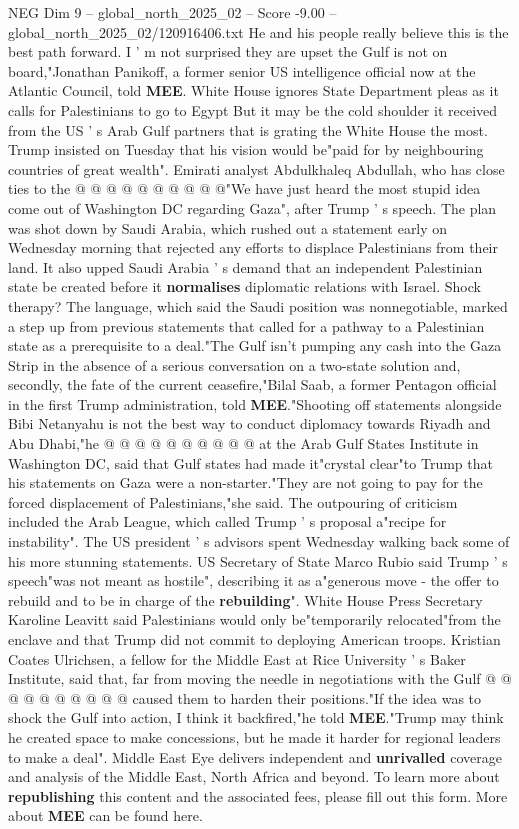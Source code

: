 \begin{textsample}{NEG Dim 9 – global\_north\_2025\_02 – Score -9.00 – global\_north\_2025\_02/120916406.txt}
He and his people really believe this is the best path forward.
I ' m not surprised they are upset the Gulf is not on board,"Jonathan Panikoff, a former senior US intelligence official now at the Atlantic Council, told \textbf{MEE}.
White House ignores State Department pleas as it calls for Palestinians to go to Egypt But it may be the cold shoulder it received from the US ' s Arab Gulf partners that is grating the White House the most.
Trump insisted on Tuesday that his vision would be"paid for by neighbouring countries of great wealth".
Emirati analyst Abdulkhaleq Abdullah, who has close ties to the @ @ @ @ @ @ @ @ @ @"We have just heard the most stupid idea come out of Washington DC regarding Gaza", after Trump ' s speech.
The plan was shot down by Saudi Arabia, which rushed out a statement early on Wednesday morning that rejected any efforts to displace Palestinians from their land.
It also upped Saudi Arabia ' s demand that an independent Palestinian state be created before it \textbf{normalises} diplomatic relations with Israel.
Shock therapy?
The language, which said the Saudi position was nonnegotiable, marked a step up from previous statements that called for a pathway to a Palestinian state as a prerequisite to a deal."The Gulf isn't pumping any cash into the Gaza Strip in the absence of a serious conversation on a two-state solution and, secondly, the fate of the current ceasefire,"Bilal Saab, a former Pentagon official in the first Trump administration, told \textbf{MEE}."Shooting off statements alongside Bibi Netanyahu is not the best way to conduct diplomacy towards Riyadh and Abu Dhabi,"he @ @ @ @ @ @ @ @ @ @ at the Arab Gulf States Institute in Washington DC, said that Gulf states had made it"crystal clear"to Trump that his statements on Gaza were a non-starter."They are not going to pay for the forced displacement of Palestinians,"she said.
The outpouring of criticism included the Arab League, which called Trump ' s proposal a"recipe for instability".
The US president ' s advisors spent Wednesday walking back some of his more stunning statements.
US Secretary of State Marco Rubio said Trump ' s speech"was not meant as hostile", describing it as a"generous move - the offer to rebuild and to be in charge of the \textbf{rebuilding}".
White House Press Secretary Karoline Leavitt said Palestinians would only be"temporarily relocated"from the enclave and that Trump did not commit to deploying American troops.
Kristian Coates Ulrichsen, a fellow for the Middle East at Rice University ' s Baker Institute, said that, far from moving the needle in negotiations with the Gulf @ @ @ @ @ @ @ @ @ @ caused them to harden their positions."If the idea was to shock the Gulf into action, I think it backfired,"he told \textbf{MEE}."Trump may think he created space to make concessions, but he made it harder for regional leaders to make a deal".
Middle East Eye delivers independent and \textbf{unrivalled} coverage and analysis of the Middle East, North Africa and beyond.
To learn more about \textbf{republishing} this content and the associated fees, please fill out this form.
More about \textbf{MEE} can be found here.


\end{textsample}
